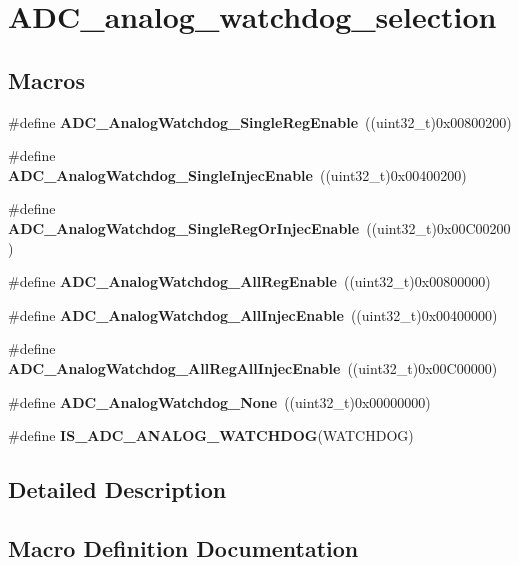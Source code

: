 \section{A\+D\+C\+\_\+analog\+\_\+watchdog\+\_\+selection}
\label{group__ADC__analog__watchdog__selection}
\subsection*{Macros}
\begin{DoxyCompactItemize}
\item 
\#define \textbf{ A\+D\+C\+\_\+\+Analog\+Watchdog\+\_\+\+Single\+Reg\+Enable}~((uint32\+\_\+t)0x00800200)
\item 
\#define \textbf{ A\+D\+C\+\_\+\+Analog\+Watchdog\+\_\+\+Single\+Injec\+Enable}~((uint32\+\_\+t)0x00400200)
\item 
\#define \textbf{ A\+D\+C\+\_\+\+Analog\+Watchdog\+\_\+\+Single\+Reg\+Or\+Injec\+Enable}~((uint32\+\_\+t)0x00\+C00200)
\item 
\#define \textbf{ A\+D\+C\+\_\+\+Analog\+Watchdog\+\_\+\+All\+Reg\+Enable}~((uint32\+\_\+t)0x00800000)
\item 
\#define \textbf{ A\+D\+C\+\_\+\+Analog\+Watchdog\+\_\+\+All\+Injec\+Enable}~((uint32\+\_\+t)0x00400000)
\item 
\#define \textbf{ A\+D\+C\+\_\+\+Analog\+Watchdog\+\_\+\+All\+Reg\+All\+Injec\+Enable}~((uint32\+\_\+t)0x00\+C00000)
\item 
\#define \textbf{ A\+D\+C\+\_\+\+Analog\+Watchdog\+\_\+\+None}~((uint32\+\_\+t)0x00000000)
\item 
\#define \textbf{ I\+S\+\_\+\+A\+D\+C\+\_\+\+A\+N\+A\+L\+O\+G\+\_\+\+W\+A\+T\+C\+H\+D\+OG}(W\+A\+T\+C\+H\+D\+OG)
\end{DoxyCompactItemize}


\subsection{Detailed Description}


\subsection{Macro Definition Documentation}
\mbox{\label{group__ADC__analog__watchdog__selection_gae4d6a7ebb136d924f0c8bad2cbac0574}} 
